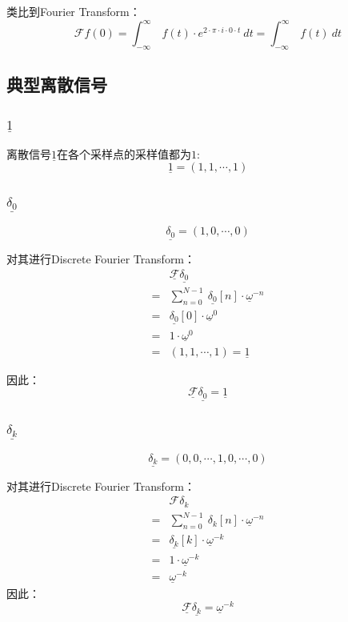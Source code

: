 类比到Fourier Transform：
$$
	\mathcal{F}f(0)=\int_{-\infty}^\infty\ f(t)\cdot e^{2\cdot \pi\cdot i\cdot 0\cdot t}\ dt=\int_{-\infty}^\infty\ f(t)\ dt
$$
\subsection{典型离散信号}
\subsubsection{$\underline{1}$}
离散信号$\underline{1}$在各个采样点的采样值都为$1$:
$$\underline{1}=(1,1,\cdots,1)$$
\subsubsection{$\underline{\delta_0}$}
$$\underline{\delta_0}=(1,0,\cdots,0)$$

对其进行Discrete Fourier Transform：
\begin{align*}
	  & \underline{\mathcal{F}}\underline{\delta_0}                                   \\
	= & \sum\limits_{n=0}^{N-1}\ \underline{\delta_0}[n]\cdot \underline{\omega}^{-n} \\
	= & \underline{\delta_0}[0]\cdot \underline{\omega}^0                             \\
	= & 1\cdot \underline{\omega}^0                                                   \\
	= & (1,1,\cdots,1)=\underline{1}
\end{align*}

因此：
\begin{equation}
	\underline{\mathcal{F}}\underline{\delta_0}=\underline{1}
\end{equation}

\subsubsection{$\underline{\delta_k}$}
$$\underline{\delta_k}=(0,0,\cdots,1,0,\cdots,0)$$

对其进行Discrete Fourier Transform：
\begin{align*}
	  & \mathcal{F}\delta_k                                               \\
	= & \sum\limits_{n=0}^{N-1}\ \delta_k[n]\cdot \underline{\omega}^{-n} \\
	= & \underline{\delta_k}[k]\cdot \underline{\omega}^{-k}              \\
	= & 1\cdot \underline{\omega}^{-k}                                    \\
	= & \underline{\omega}^{-k}
\end{align*}
因此：
\begin{equation}
	\underline{\mathcal{F}}\underline{\delta_k}=\underline{\omega}^{-k}
\end{equation}
